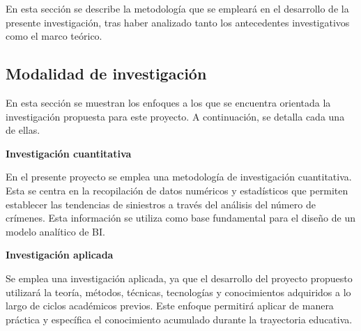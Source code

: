 En esta sección se describe la metodología que se empleará en el desarrollo de la presente investigación,
tras haber analizado tanto los antecedentes investigativos como el marco teórico.

\subsection{Modalidad de investigación}
En esta sección se muestran los enfoques a los que se encuentra orientada la investigación propuesta para este proyecto. A continuación, se detalla
cada una de ellas.

\bigbreak
\textbf{Investigación cuantitativa}
\bigbreak

En el presente proyecto se emplea una metodología de investigación cuantitativa. Esta se centra en la recopilación de
datos numéricos y estadísticos que permiten establecer las tendencias de siniestros a través del análisis del número
de crímenes. Esta información se utiliza como base fundamental para el diseño de un modelo analítico de BI.

\bigbreak
\textbf{Investigación aplicada}
\bigbreak

Se emplea una investigación aplicada, ya que el desarrollo del proyecto propuesto utilizará la teoría, métodos,
técnicas, tecnologías y conocimientos adquiridos a lo largo de ciclos académicos previos. Este enfoque permitirá
aplicar de manera práctica y específica el conocimiento acumulado durante la trayectoria educativa.



